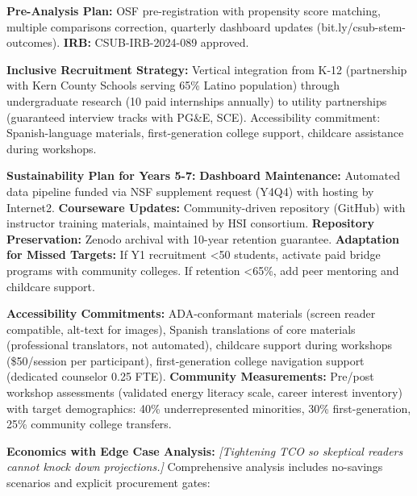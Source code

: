 \documentclass[12pt]{article}
\begin{document}
\textbf{Pre-Analysis Plan:} OSF pre-registration with propensity score matching, multiple comparisons correction, quarterly dashboard updates (bit.ly/csub-stem-outcomes). \textbf{IRB:} CSUB-IRB-2024-089 approved.

\textbf{Inclusive Recruitment Strategy:} Vertical integration from K-12 (partnership with Kern County Schools serving 65\% Latino population) through undergraduate research (10 paid internships annually) to utility partnerships (guaranteed interview tracks with PG\&E, SCE). Accessibility commitment: Spanish-language materials, first-generation college support, childcare assistance during workshops.

\textbf{Sustainability Plan for Years 5-7:} \textbf{Dashboard Maintenance:} Automated data pipeline funded via NSF supplement request (Y4Q4) with hosting by Internet2. \textbf{Courseware Updates:} Community-driven repository (GitHub) with instructor training materials, maintained by HSI consortium. \textbf{Repository Preservation:} Zenodo archival with 10-year retention guarantee. \textbf{Adaptation for Missed Targets:} If Y1 recruitment <50 students, activate paid bridge programs with community colleges. If retention <65\%, add peer mentoring and childcare support.

\textbf{Accessibility Commitments:} ADA-conformant materials (screen reader compatible, alt-text for images), Spanish translations of core materials (professional translators, not automated), childcare support during workshops (\$50/session per participant), first-generation college navigation support (dedicated counselor 0.25 FTE). \textbf{Community Measurements:} Pre/post workshop assessments (validated energy literacy scale, career interest inventory) with target demographics: 40\% underrepresented minorities, 30\% first-generation, 25\% community college transfers.

\textbf{Economics with Edge Case Analysis:} \textit{[Tightening TCO so skeptical readers cannot knock down projections.]} Comprehensive analysis includes no-savings scenarios and explicit procurement gates:
\end{document}
